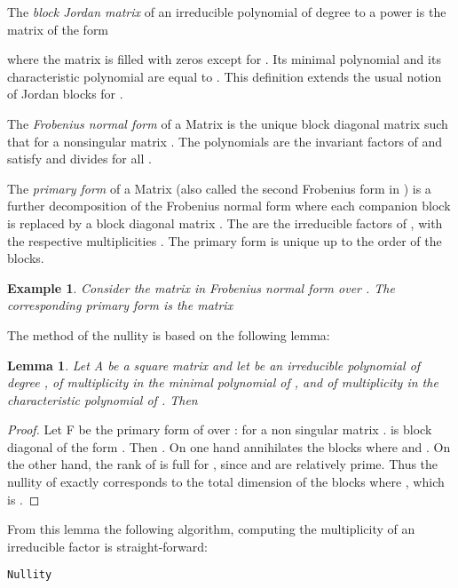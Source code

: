 \documentclass{article}
\newtheorem{lem}[thm]{Lemma}
\newtheorem{exmp}[thm]{Example}
\begin{document}
The \textit{block Jordan matrix} of an irreducible polynomial  of degree  to a
power  is the  matrix  of the form

where the  matrix  is filled with zeros except for .
Its minimal polynomial and its characteristic polynomial are equal to .
This definition extends the usual notion of Jordan blocks for .
 
The \textit{Frobenius normal form} of a Matrix  is the unique  block diagonal matrix
 such that  for a nonsingular matrix
. The polynomials  are the invariant factors of  and satisfy  and  divides  for all .

The \textit{primary form} of a Matrix  (also called the second Frobenius form in
\cite{Gantmacher:1959:TMone}) is a further decomposition of the Frobenius
normal form where each companion block  is replaced by a block
diagonal matrix  . 
  The  are the irreducible factors of , with the respective
  multiplicities . 
The primary form is unique up to the order of the blocks. 


\begin{exmp}
Consider the matrix in Frobenius normal form 
{\small } over
. The corresponding 
 primary form is the matrix {\small }\\
{\scriptsize
}
\end{exmp}
The method of the nullity is based on the following lemma:
\begin{lem}
Let A be a square matrix and 
let  be an irreducible polynomial 
of degree , of multiplicity  in the minimal polynomial of ,
and of multiplicity  in the characteristic polynomial of .  
Then 
\end{lem}
\begin{proof}
Let F be the primary form of  over :  for a non singular
matrix .
 is block diagonal of the form 
.
Then .
On one hand  annihilates the blocks  where  and
.
On the other hand, the rank of  is full for ,
since  and  are relatively prime.
Thus the nullity of  exactly corresponds to the
total dimension of the blocks  where , which is .
\end{proof}
From this lemma the following algorithm, computing the multiplicity  of an
irreducible factor  is straight-forward:
\begin{algorithm}
  \dontprintsemicolon
  \caption{\texttt{Nullity}}\label{alg:nullity}
  \Begin{
      \;
      \Return \;
    }
  \end{algorithm}
\end{document}
